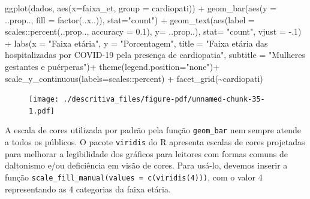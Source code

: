 \documentclass[
  letterpaper,
  DIV=11,
  numbers=noendperiod]{scrreprt}
\newenvironment{Shaded}{\begin{snugshade}}{\end{snugshade}}
\newcommand{\AttributeTok}[1]{\textcolor[rgb]{0.40,0.45,0.13}{#1}}
\newcommand{\DecValTok}[1]{\textcolor[rgb]{0.68,0.00,0.00}{#1}}
\newcommand{\FloatTok}[1]{\textcolor[rgb]{0.68,0.00,0.00}{#1}}
\newcommand{\FunctionTok}[1]{\textcolor[rgb]{0.28,0.35,0.67}{#1}}
\newcommand{\NormalTok}[1]{\textcolor[rgb]{0.00,0.23,0.31}{#1}}
\newcommand{\SpecialCharTok}[1]{\textcolor[rgb]{0.37,0.37,0.37}{#1}}
\newcommand{\StringTok}[1]{\textcolor[rgb]{0.13,0.47,0.30}{#1}}
\begin{document}
\begin{Shaded}
\begin{Highlighting}[]
\FunctionTok{ggplot}\NormalTok{(dados, }\FunctionTok{aes}\NormalTok{(}\AttributeTok{x=}\NormalTok{faixa\_et, }\AttributeTok{group =}\NormalTok{ cardiopati))  }\SpecialCharTok{+} 
  \FunctionTok{geom\_bar}\NormalTok{(}\FunctionTok{aes}\NormalTok{(}\AttributeTok{y =}\NormalTok{ ..prop.., }\AttributeTok{fill =} \FunctionTok{factor}\NormalTok{(..x..)), }\AttributeTok{stat=}\StringTok{"count"}\NormalTok{) }\SpecialCharTok{+}
  \FunctionTok{geom\_text}\NormalTok{(}\FunctionTok{aes}\NormalTok{(}\AttributeTok{label =}\NormalTok{ scales}\SpecialCharTok{::}\FunctionTok{percent}\NormalTok{(..prop.., }\AttributeTok{accuracy =} \FloatTok{0.1}\NormalTok{), }\AttributeTok{y=}\NormalTok{ ..prop..), }\AttributeTok{stat=} \StringTok{"count"}\NormalTok{, }\AttributeTok{vjust =} \SpecialCharTok{{-}}\NormalTok{.}\DecValTok{1}\NormalTok{) }\SpecialCharTok{+}
  \FunctionTok{labs}\NormalTok{(}\AttributeTok{x =} \StringTok{"Faixa etária"}\NormalTok{, }\AttributeTok{y =} \StringTok{"Porcentagem"}\NormalTok{, }\AttributeTok{title =} \StringTok{"Faixa etária das hospitalizadas por COVID{-}19 pela presença de cardiopatia"}\NormalTok{, }\AttributeTok{subtitle =} \StringTok{"Mulheres gestantes e puérperas"}\NormalTok{)}\SpecialCharTok{+}
  \FunctionTok{theme}\NormalTok{(}\AttributeTok{legend.position=}\StringTok{"none"}\NormalTok{)}\SpecialCharTok{+}
  \FunctionTok{scale\_y\_continuous}\NormalTok{(}\AttributeTok{labels=}\NormalTok{scales}\SpecialCharTok{::}\NormalTok{percent) }\SpecialCharTok{+}
  \FunctionTok{facet\_grid}\NormalTok{(}\SpecialCharTok{\textasciitilde{}}\NormalTok{cardiopati)}
\end{Highlighting}
\end{Shaded}

\begin{figure}[H]

{\centering \texttt{[image: ./descritiva\_files/figure-pdf/unnamed-chunk-35-1.pdf]}

}

\end{figure}

A escala de cores utilizada por padrão pela função \texttt{geom\_bar}
nem sempre atende a todos os públicos. O pacote \texttt{viridis} do R
apresenta escalas de cores projetadas para melhorar a legibilidade dos
gráficos para leitores com formas comuns de daltonismo e/ou deficiência
em visão de cores. Para usá-lo, devemos inserir a função
\texttt{scale\_fill\_manual(values\ =\ c(viridis(4)))}, com o valor 4
representando as 4 categorias da faixa etária.
\end{document}
